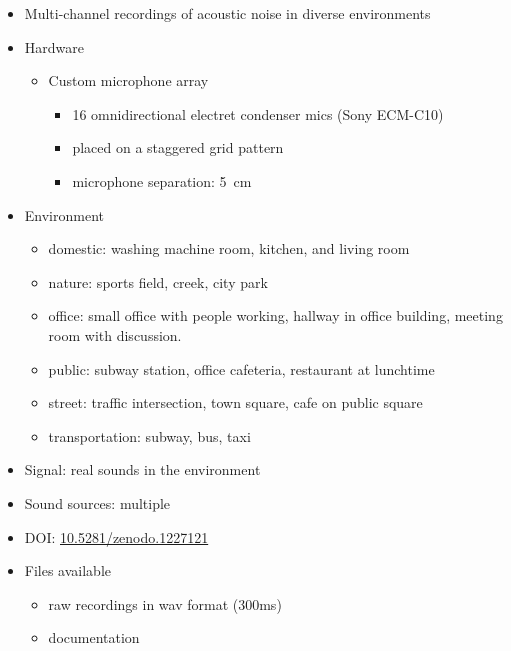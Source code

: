 \documentclass[14pt, oneside]{extarticle}
\begin{document}
\begin{itemize}

\item Multi-channel recordings of acoustic noise in diverse environments \cite{thiemann2013demand}

\item Hardware
	\begin{itemize}
	\item Custom microphone array
		\begin{itemize}
		\item 16 omnidirectional electret condenser mics (Sony ECM-C10) 
		\item placed on a staggered grid pattern 
		\item microphone separation: \SI{5}{\centi\metre}
		\end{itemize}
	\end{itemize}

\item Environment
	\begin{itemize}
	\item domestic: washing machine room, kitchen, and living room
	\item nature: sports field, creek, city park
	\item office: small office with people working, hallway in office building, meeting room with discussion.
	\item public: subway station, office cafeteria, restaurant at lunchtime
	\item street: traffic intersection, town square, cafe on public square
	\item transportation: subway, bus, taxi
	\end{itemize}

\item Signal: real sounds in the environment

\item Sound sources: multiple

\item DOI: \href{https://zenodo.org/record/1227121}{10.5281/zenodo.1227121} 

\item Files available
	\begin{itemize}
	\item raw recordings in wav format (300ms)
	\item documentation
	\end{itemize}

\end{itemize}
\end{document}
